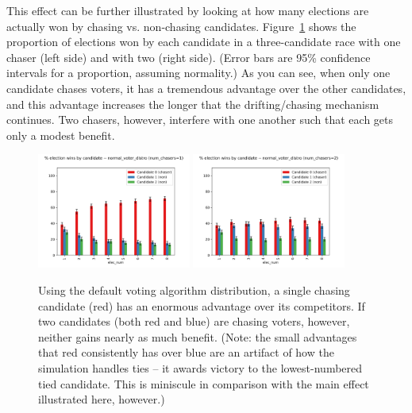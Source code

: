 This effect can be further illustrated by looking at how many elections are
actually won by chasing vs. non-chasing candidates.
Figure~\ref{chasing_winners} shows the proportion of elections won by each
candidate in a three-candidate race with one chaser (left side) and with two
(right side). (Error bars are 95\% confidence intervals for a proportion,
assuming normality.) As you can see, when only one candidate chases voters, it
has a tremendous advantage over the other candidates, and this advantage
increases the longer that the drifting/chasing mechanism continues. Two
chasers, however, interfere with one another such that each gets only a modest
benefit.

\begin{figure}[ht]
\centering
\includegraphics[width=0.45\textwidth]{assets/one_chaser_big_benefit.png}
\includegraphics[width=0.45\textwidth]{assets/two_chasers_small_benefit.png}
\caption{Using the default voting algorithm distribution, a single chasing
candidate (red) has an enormous advantage over its competitors. If two
candidates (both red and blue) are chasing voters, however, neither gains
nearly as much benefit. (Note: the small advantages that red consistently has
over blue are an artifact of how the simulation handles ties -- it awards
victory to the lowest-numbered tied candidate. This is miniscule in comparison
with the main effect illustrated here, however.)}
\label{chasing_winners}
\end{figure}

